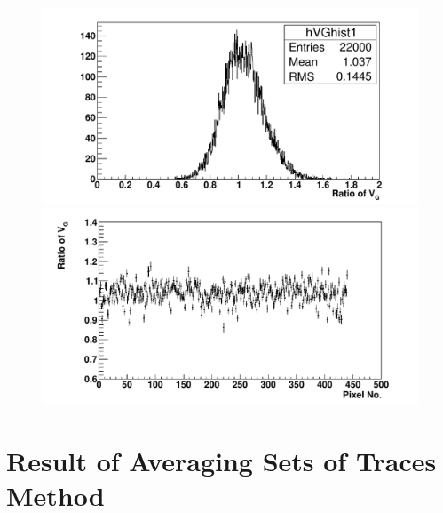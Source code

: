 \begin{figure} %
\includegraphics[width=\textwidth]{chapters/graphs/GainVarsMeas/LL_m04_2016-06-11/Set0and2/GainVairanceHist_Pairs.pdf}
\caption{}
\vspace{3mm}
\includegraphics[width=\textwidth]{chapters/graphs/GainVarsMeas/LL_m04_2016-06-11/Set0and2/GainVars_Vs_Pixel_GainVariance_Pairs_Set0and2.pdf}
\caption{}
\end{figure}

\section{Result of Averaging Sets of Traces Method}

